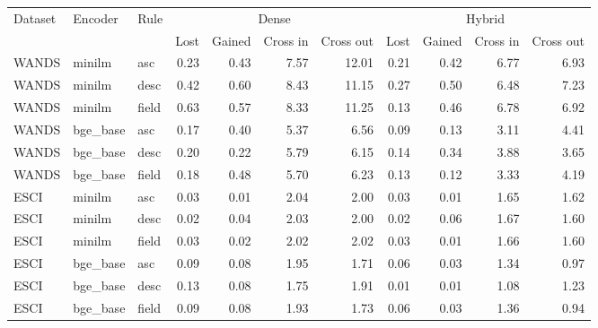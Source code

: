 \begin{tabular}{lllrrrrrrrr}
\toprule
Dataset & Encoder & Rule & \multicolumn{4}{c}{Dense} & \multicolumn{4}{c}{Hybrid} \\
 & & & Lost & Gained & Cross in & Cross out & Lost & Gained & Cross in & Cross out \\
\midrule
WANDS & minilm & asc & 0.23 & 0.43 & 7.57 & 12.01 & 0.21 & 0.42 & 6.77 & 6.93 \\
WANDS & minilm & desc & 0.42 & 0.60 & 8.43 & 11.15 & 0.27 & 0.50 & 6.48 & 7.23 \\
WANDS & minilm & field & 0.63 & 0.57 & 8.33 & 11.25 & 0.13 & 0.46 & 6.78 & 6.92 \\
WANDS & bge\_base & asc & 0.17 & 0.40 & 5.37 & 6.56 & 0.09 & 0.13 & 3.11 & 4.41 \\
WANDS & bge\_base & desc & 0.20 & 0.22 & 5.79 & 6.15 & 0.14 & 0.34 & 3.88 & 3.65 \\
WANDS & bge\_base & field & 0.18 & 0.48 & 5.70 & 6.23 & 0.13 & 0.12 & 3.33 & 4.19 \\
ESCI & minilm & asc & 0.03 & 0.01 & 2.04 & 2.00 & 0.03 & 0.01 & 1.65 & 1.62 \\
ESCI & minilm & desc & 0.02 & 0.04 & 2.03 & 2.00 & 0.02 & 0.06 & 1.67 & 1.60 \\
ESCI & minilm & field & 0.03 & 0.02 & 2.02 & 2.02 & 0.03 & 0.01 & 1.66 & 1.60 \\
ESCI & bge\_base & asc & 0.09 & 0.08 & 1.95 & 1.71 & 0.06 & 0.03 & 1.34 & 0.97 \\
ESCI & bge\_base & desc & 0.13 & 0.08 & 1.75 & 1.91 & 0.01 & 0.01 & 1.08 & 1.23 \\
ESCI & bge\_base & field & 0.09 & 0.08 & 1.93 & 1.73 & 0.06 & 0.03 & 1.36 & 0.94 \\
\bottomrule
\end{tabular}
